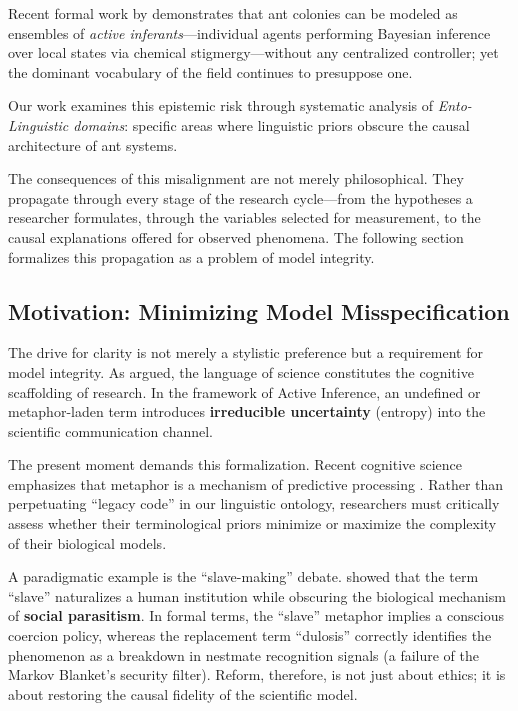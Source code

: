 \documentclass[
]{article}
\numberwithin{equation}{section}
\begin{document}
Recent formal work by \citet{friedman2021active} demonstrates that ant
colonies can be modeled as ensembles of \emph{active
inferants}---individual agents performing Bayesian inference over local
states via chemical stigmergy---without any centralized controller; yet
the dominant vocabulary of the field continues to presuppose one.

Our work examines this epistemic risk through systematic analysis of
\emph{Ento-Linguistic domains}: specific areas where linguistic priors
obscure the causal architecture of ant systems.

The consequences of this misalignment are not merely philosophical. They
propagate through every stage of the research cycle---from the
hypotheses a researcher formulates, through the variables selected for
measurement, to the causal explanations offered for observed phenomena.
The following section formalizes this propagation as a problem of model
integrity.

\subsection{Motivation: Minimizing Model
Misspecification}\label{motivation-minimizing-model-misspecification}

The drive for clarity is not merely a stylistic preference but a
requirement for model integrity. As \citet{keller1995language} argued,
the language of science constitutes the cognitive scaffolding of
research. In the framework of Active Inference, an undefined or
metaphor-laden term introduces \textbf{irreducible uncertainty}
(entropy) into the scientific communication channel.

The present moment demands this formalization. Recent cognitive science
emphasizes that metaphor is a mechanism of predictive processing
\cite{steen2017deliberate}. Rather than perpetuating ``legacy code'' in
our linguistic ontology, researchers must critically assess whether
their terminological priors minimize or maximize the complexity of their
biological models.

A paradigmatic example is the ``slave-making'' debate.
\citet{herbers2006} showed that the term ``slave'' naturalizes a human
institution while obscuring the biological mechanism of \textbf{social
parasitism}. In formal terms, the ``slave'' metaphor implies a conscious
coercion policy, whereas the replacement term ``dulosis'' correctly
identifies the phenomenon as a breakdown in nestmate recognition signals
(a failure of the Markov Blanket's security filter). Reform, therefore,
is not just about ethics; it is about restoring the causal fidelity of
the scientific model.
\end{document}
